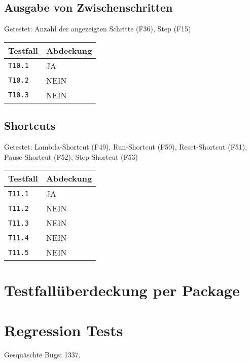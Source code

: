 \documentclass[parskip=full,11pt,twoside]{scrartcl}
\begin{document}
\subsection{Ausgabe von Zwischenschritten}
    Getestet: Anzahl der angezeigten Schritte (F36), Step (F15)
	\label{shortcuts}
	\begin{center}
		\begin{tabular}{ p{9cm} p{4cm}}
    			Testfall & Abdeckung \\ \hline
    			\texttt{T10.1} & \cellcolor{green!20}JA \\ \hline
    			\texttt{T10.2} & \cellcolor{red!20}NEIN \\ \hline
			\texttt{T10.3} & \cellcolor{red!20}NEIN \\ \hline
		\end{tabular}
	\end{center}

\subsection{Shortcuts}
    Getestet: Lambda-Shortcut (F49), Run-Shortcut (F50), Reset-Shortcut (F51), Pause-Shortcut (F52), Step-Shortcut (F53)
	\label{shortcuts}
	\begin{center}
		\begin{tabular}{ p{9cm} p{4cm}}
    			Testfall & Abdeckung \\ \hline
    			\texttt{T11.1} & \cellcolor{green!20}JA \\ \hline
    			\texttt{T11.2} & \cellcolor{red!20}NEIN \\ \hline
			\texttt{T11.3} & \cellcolor{red!20}NEIN \\ \hline
			\texttt{T11.4} & \cellcolor{red!20}NEIN \\ \hline
			\texttt{T11.5} & \cellcolor{red!20}NEIN \\ \hline
		\end{tabular}
	\end{center}
	
    \section{Testfallüberdeckung per Package}

    \section{Regression Tests}
    Gesquäschte Bugs: 1337.
    
\end{document}
